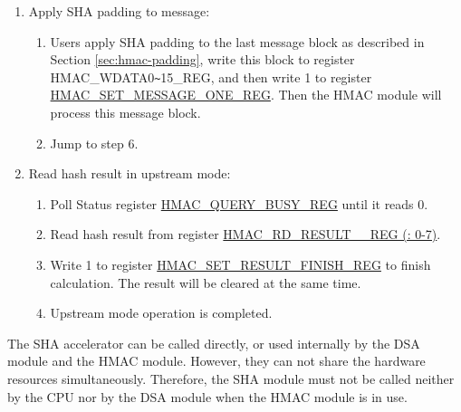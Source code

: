 \documentclass[main\_\_EN.tex]{subfiles}
\begin{document}
\begin{enumerate}
\begin{enumerate}
\begin{itemize}
\begin{enumerate}
                \item If Block\_\textcolor{red}{n} is the second last padded block, write 1 to register\\ \hyperref[regdesc:HMACSETMESSAGEPADREG]{HMAC\_SET\_MESSAGE\_PAD\_REG}, and then jump to step 5.
                \item If Block\_\textcolor{red}{n} is neither the last nor the second last message block, write 1 to register \\\hyperref[regdesc:HMACSETMESSAGEINGREG]{HMAC\_SET\_MESSAGE\_ING\_REG} and define $n=n+1$, and then jump to step 4.(b).
            \end{enumerate}
        \end{itemize}
    \end{enumerate}

    \item Apply SHA padding to message:
    \begin{enumerate}
        \item Users apply SHA padding to the last message block as described in Section \ref{sec:hmac-padding}, write this block to register HMAC\_WDATA0\verb+~+15\_REG, and then write 1 to register \hyperref[regdesc:HMACSETMESSAGEONEREG]{HMAC\_SET\_MESSAGE\_ONE\_REG}. Then the HMAC module will process this message block.
        \item Jump to step 6.
    \end{enumerate}

    \item Read hash result in upstream mode:
    \begin{enumerate}
        \item Poll Status register \hyperref[regdesc:HMACQUERYBUSYREG]{HMAC\_QUERY\_BUSY\_REG} until it reads 0.
        \item Read hash result from register \hyperref[regdesc:HMACRDRESULTNREG]{HMAC\_RD\_RESULT\_\_REG (: 0-7)}.
        \item Write 1 to register \hyperref[regdesc:HMACSETRESULTFINISHREG]{HMAC\_SET\_RESULT\_FINISH\_REG} to finish calculation. The result will be cleared at the same time.
        \item Upstream mode operation is completed.
    \end{enumerate}

\end{enumerate}

\begin{tiplisting}
    The SHA accelerator can be called directly, or used internally by the DSA module and the HMAC module. However, they can not share the hardware resources simultaneously. Therefore, the SHA module must not be called neither by the CPU nor by the DSA module when the HMAC module is in use.
\end{tiplisting}
\end{document}
